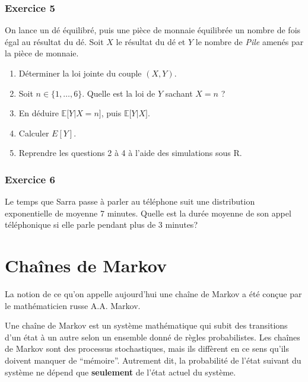 \documentclass[
]{book}
\theoremstyle{definition}
\theoremstyle{definition}
\theoremstyle{definition}
\theoremstyle{remark}
\begin{document}
\hypertarget{exercice-5}{%
\subsection*{Exercice 5}\label{exercice-5}}

On lance un dé équilibré, puis une pièce de monnaie équilibrée un nombre de fois égal au résultat
du dé. Soit \(X\) le résultat du dé et \(Y\) le nombre de \emph{Pile} amenés par la pièce de monnaie.

\begin{enumerate}
\def\labelenumi{\arabic{enumi}.}
\item
  Déterminer la loi jointe du couple \((X, Y )\).
\item
  Soit \(n \in \{1, \ldots, 6\}\). Quelle est la loi de \(Y\) sachant \(X = n\) ?
\item
  En déduire \(\mathbb{E}\bigl[Y |X = n\bigr]\), puis \(\mathbb{E}\bigl[Y |X\bigr]\).
\item
  Calculer \(E[Y]\).
\item
  Reprendre les questions 2 à 4 à l'aide des simulations sous R.
\end{enumerate}

\hypertarget{exercice-6}{%
\subsection*{Exercice 6}\label{exercice-6}}

Le temps que Sarra passe à parler au téléphone suit une distribution exponentielle de moyenne 7 minutes. Quelle est la durée moyenne de son appel téléphonique si elle parle pendant plus de 3 minutes?

\hypertarget{chauxeenes-de-markov}{%
\chapter{Chaînes de Markov}\label{chauxeenes-de-markov}}

La notion de ce qu'on appelle aujourd'hui une chaîne de Markov a été conçue par le mathématicien russe A.A. Markov.

Une chaîne de Markov est un système mathématique qui subit des transitions d'un état à un autre selon un ensemble donné de règles probabilistes. Les chaînes de Markov sont des processus stochastiques, mais ils diffèrent en ce sens qu'ils doivent manquer de ``mémoire''. Autrement dit, la probabilité de l'état suivant du système ne dépend que \textbf{seulement} de l'état actuel du système.
\end{document}
